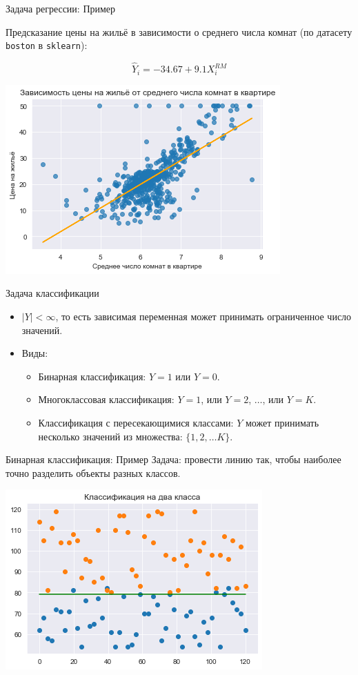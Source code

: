 \documentclass[c, handout]{beamer} %
\begin{document}
	\begin{frame}{Задача регрессии: Пример}
		
		Предсказание цены на жильё в зависимости о среднего числа комнат (по датасету {\tt boston} в {\tt sklearn}):
		
		\[
		\hat{Y}_i = -34.67 + 9.1X^{RM}_i 
		\]
		
		\begin{center}
			\includegraphics[width=0.7\linewidth]{b.png}
		\end{center}
	
	\end{frame}

	\begin{frame}{Задача классификации}
		\begin{itemize}
			\item<1-> $|Y| < \infty$, то есть зависимая переменная может принимать ограниченное число значений.
			\item<2-> Виды:
			\begin{itemize}
				\item Бинарная классификация: $Y = 1$ или $Y = 0$.
				\item Многоклассовая классификация: $Y = 1$, или $Y = 2$, $\ldots$, или $Y = K$.
				\item Классификация с пересекающимися классами: $Y$ может принимать несколько значений из множества: $\{1, 2, \ldots K\}$.
			\end{itemize}
		\end{itemize}
		
	\end{frame}

	\begin{frame}{Бинарная классификация: Пример}
		Задача: провести линию так, чтобы наиболее точно разделить объекты разных классов.
		
		\begin{center}
			\includegraphics[width=0.6\linewidth]{c.png}
		\end{center}
	\end{frame}
\end{document}
